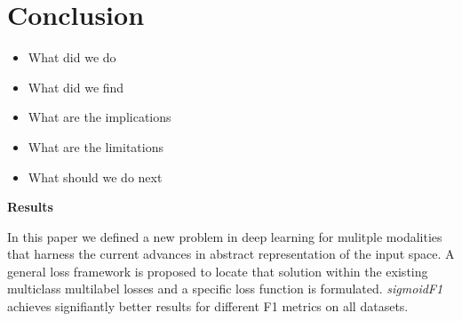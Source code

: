 
\section{Conclusion}
\label{sec:orged3d8a1}
\begin{itemize}[leftmargin=*]
\item What did we do
\item What did we find
\item What are the implications
\item What are the limitations
\item What should we do next
\end{itemize}


\textbf{Results}

In this paper we defined a new problem in deep learning for mulitple modalities that harness the current advances in abstract representation of the input space. A general loss framework is proposed to locate that solution within the existing multiclass multilabel losses and a specific loss function is formulated. \emph{sigmoidF1} achieves signifiantly better results for different F1 metrics on all datasets.

